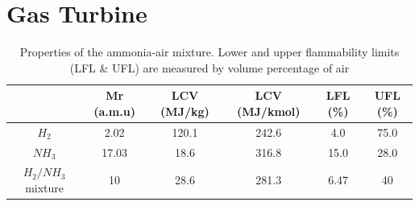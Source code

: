 

%
\section{Gas Turbine}

\begin{table} [h]
\begin{center}
\caption{Properties of the ammonia-air mixture. Lower and upper flammability limits (LFL \& UFL) are measured by volume percentage of air \cite{FL}} \label{tab:mixproperties}
\begin{tabular}{ |c|c|c|c|c|c| }
 \hline
& Mr (a.m.u) & LCV (MJ/kg) \cite{website:spg}& LCV (MJ/kmol) & LFL (\%)& UFL (\%) \\ 
 \hline
  $H_2$ & 2.02 & 120.1 & 242.6 & 4.0 & 75.0\\ 
 \hline
$NH_3$ & 17.03 & 18.6 & 316.8 & 15.0 & 28.0\\ 
 \hline
$H_2/NH_3$ mixture & 10 & 28.6 & 281.3 & 6.47 & 40\\
 \hline
\end{tabular}
\end{center} 
\end{table}


